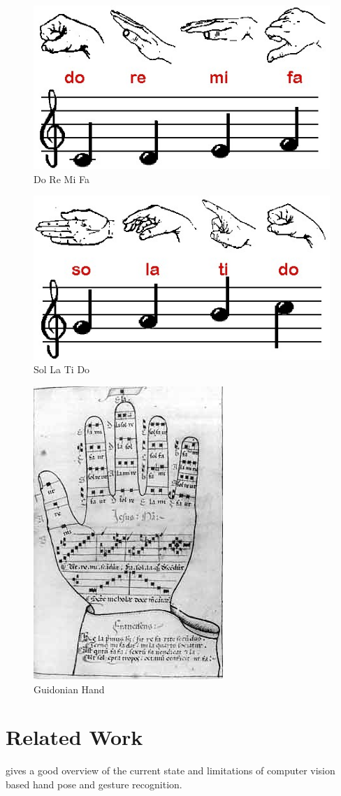 \begin{figure}[h]
	\center{}
	\label{fig:doremifa}
	\includegraphics[width=0.3\linewidth]{figures/doremifa.jpg}
	\caption{Do Re Mi Fa}
\end{figure}

\begin{figure}[h]
	\center{}
	\label{fig:solatido}
	\includegraphics[width=0.3\linewidth]{figures/solatido.jpg}
	\caption{Sol La Ti Do}
\end{figure}

\begin{figure}[h]
	\center{}
	\label{fig:guidonian}
	\includegraphics[width=0.3\linewidth]{figures/guidonian_hand.jpg}
	\caption{Guidonian Hand}
\end{figure}


\section{Related Work}
\cite{Erol2007} gives a good overview of the current state and limitations of computer vision based hand pose and gesture recognition.



